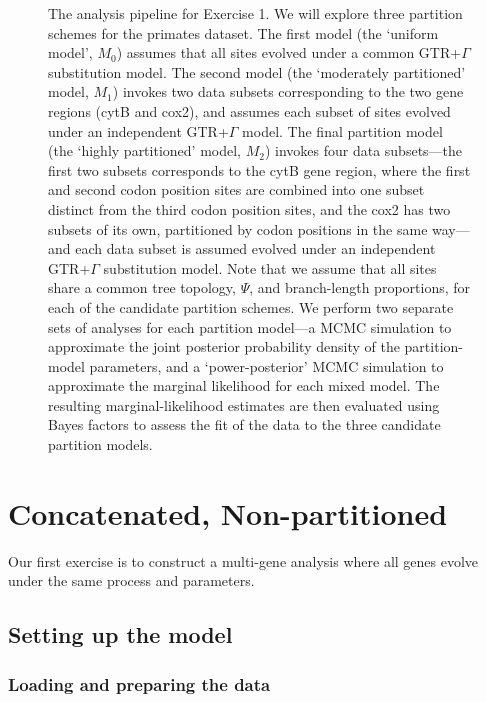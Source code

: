 \begin{figure}[ht!]
\centering
{}
\caption{\small The analysis pipeline for Exercise 1. We will explore three partition schemes for the primates dataset.
The first model (the `uniform model', $M_0$) assumes that all sites evolved under a common GTR+$\Gamma$ substitution model.
The second model (the `moderately partitioned' model, $M_1$) invokes two data subsets corresponding to the two gene regions (cytB and cox2), and assumes each subset of sites evolved under an independent GTR+$\Gamma$ model.
The final partition model (the `highly partitioned' model, $M_2$) invokes four data subsets---the first two subsets corresponds to the cytB gene region, where the first and second codon position sites are combined into one subset distinct from the third codon position sites, and the cox2 has two subsets of its own, partitioned by codon positions in the same way---and each data subset is assumed evolved under an independent GTR+$\Gamma$ substitution model.
Note that we assume that all sites share a common tree topology, $\Psi$, and branch-length proportions, for each of the candidate partition schemes.
We perform two separate sets of analyses for each partition model---a MCMC simulation to approximate the joint posterior probability density of the partition-model parameters, and a `power-posterior' MCMC simulation to approximate the marginal likelihood for each mixed model.
The resulting marginal-likelihood estimates are then evaluated using Bayes factors to assess the fit of the data to the three candidate partition models.  
}
\label{fig:pipeline}
\end{figure}
\newpage



\section{Concatenated, Non-partitioned}\label{sec:unif} 

Our first exercise is to construct a multi-gene analysis where all genes evolve under the same process and parameters.

\subsection{Setting up the model}

\subsubsection{Loading and preparing the data}

